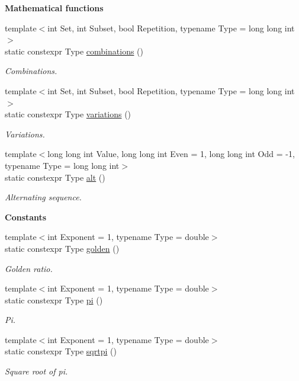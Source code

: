 \begin{Indent}{\bf Mathematical functions}
\begin{DoxyCompactItemize}
{\footnotesize template$<$int Set, int Subset, bool Repetition, typename Type  = long long int$>$ }\\static constexpr Type \hyperlink{classmagrathea_1_1AbstractShape_a4cf829267323ad25824ab956f5d9ce5a}{combinations} ()
\begin{DoxyCompactList}\small\item\em Combinations. \end{DoxyCompactList}\item 
{\footnotesize template$<$int Set, int Subset, bool Repetition, typename Type  = long long int$>$ }\\static constexpr Type \hyperlink{classmagrathea_1_1AbstractShape_a8e9095e3f654e760652205547891f4c4}{variations} ()
\begin{DoxyCompactList}\small\item\em Variations. \end{DoxyCompactList}\item 
{\footnotesize template$<$long long int Value, long long int Even = 1, long long int Odd = -\/1, typename Type  = long long int$>$ }\\static constexpr Type \hyperlink{classmagrathea_1_1AbstractShape_aad71cb2f8187c2831b6ac3b6cf8084e3}{alt} ()
\begin{DoxyCompactList}\small\item\em Alternating sequence. \end{DoxyCompactList}\end{DoxyCompactItemize}
\end{Indent}
\begin{Indent}{\bf Constants}\par
\begin{DoxyCompactItemize}
\item 
{\footnotesize template$<$int Exponent = 1, typename Type  = double$>$ }\\static constexpr Type \hyperlink{classmagrathea_1_1AbstractShape_a4b038a58859de1911d04584dd7b18e3f}{golden} ()
\begin{DoxyCompactList}\small\item\em Golden ratio. \end{DoxyCompactList}\item 
{\footnotesize template$<$int Exponent = 1, typename Type  = double$>$ }\\static constexpr Type \hyperlink{classmagrathea_1_1AbstractShape_ad782623b5d444a31418ec129c17c3c4d}{pi} ()
\begin{DoxyCompactList}\small\item\em Pi. \end{DoxyCompactList}\item 
{\footnotesize template$<$int Exponent = 1, typename Type  = double$>$ }\\static constexpr Type \hyperlink{classmagrathea_1_1AbstractShape_ab2302d9c9fe8f3294a19e1195e4cb7dc}{sqrtpi} ()
\begin{DoxyCompactList}\small\item\em Square root of pi. \end{DoxyCompactList}\end{DoxyCompactItemize}
\end{Indent}

